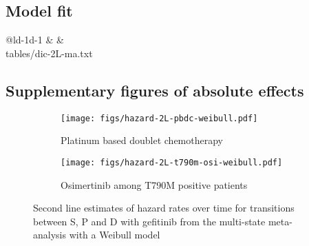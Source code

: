 \documentclass[11pt,final,fleqn]{article}\usepackage[]{graphicx}\usepackage[]{color}
\makeatletter
\theoremstyle{plain}
\newcommand*\ExpandableInput[1]{\@@input#1 }
\makeatother
\begin{document}
\begin{appendices}
\FloatBarrier


\subsection{Model fit}\label{app:DIC-2l}

\begin{table}[!ht]
\begin{center}
\begin{threeparttable}
\caption{Deviance information criterion for second line fixed effects meta-analysis} \label{tbl:dic-ma-2L}
\begin{tabularx}{\textwidth}{@{\extracolsep{\fill}}ld{-1}d{-1}}
\hline
{} &  &   \\
\hline
\ExpandableInput{tables/dic-2L-ma.txt}
\hline
\end{tabularx}
\scriptsize
\end{threeparttable}
\end{center}
\end{table}

\subsection{Supplementary figures of absolute effects}\label{app:2l-supp-figs}

\begin{figure}
\centering
\begin{subfigure}{\textwidth}
\centering
\texttt{[image: figs/hazard-2L-pbdc-weibull.pdf]}
\caption{Platinum based doublet chemotherapy} \label{subfig:hazard-2L-pbdc-weibull}
\end{subfigure}
\begin{subfigure}{\textwidth}
\centering
\texttt{[image: figs/hazard-2L-t790m-osi-weibull.pdf]}
\caption{Osimertinib among T790M positive patients} \label{subfig:hazard-2L-t790m-osi-weibull}
\end{subfigure}
\caption{Second line estimates of hazard rates over time for transitions between S, P and D with gefitinib from the multi-state meta-analysis with a Weibull model}\label{fig:hazard-2L-weibull}
\end{figure}


\end{appendices}
\end{document}
